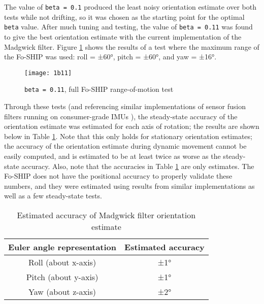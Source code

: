 \documentclass[12pt,a4paper]{report}
\begin{document}
\pagebreak

The value of \verb|beta = 0.1| produced the least noisy orientation estimate over both tests while not drifting, so it was chosen as the starting point for the optimal \verb|beta| value. After much tuning and testing, the value of \verb|beta = 0.11| was found to give the best orientation estimate with the current implementation of the Madgwick filter. Figure \ref{fig:1b11} shows the results of a test where the maximum range of the Fo-SHIP was used: roll = ±60°, pitch = ±60°, and yaw = ±16°.

\begin{figure}[htbp]
	\centering
	\texttt{[image: 1b11]}
	\caption{\texttt{beta = 0.11}, full Fo-SHIP range-of-motion test}
	\label{fig:1b11}
\end{figure}

Through these tests (and referencing similar implementations of sensor fusion filters running on consumer-grade IMUs \cite{madgwick} \cite{sfcomp} \cite{ekfmadmah} \cite{xiotech}), the steady-state accuracy of the orientation estimate was estimated for each axis of rotation; the results are shown below in Table \ref{tab:angleacc}. Note that this only holds for stationary orientation estimates; the accuracy of the orientation estimate during dynamic movement cannot be easily computed, and is estimated to be at least twice as worse as the steady-state accuracy. Also, note that the accuracies in Table \ref{tab:angleacc} are only estimates. The Fo-SHIP does not have the positional accuracy to properly validate these numbers, and they were estimated using results from similar implementations as well as a few steady-state tests.

\begin{table}[htbp]
	\centering
	\caption{Estimated accuracy of Madgwick filter orientation estimate}
	\label{tab:angleacc}
	\begin{tabular}{|c|c|}
		\hline
		Euler angle representation & Estimated accuracy \\
		\hline
		Roll (about x-axis) & ±1° \\
		\hline
		Pitch (about y-axis) & ±1° \\
		\hline
		Yaw (about z-axis) & ±2° \\
		\hline
	\end{tabular}
\end{table}
\end{document}
